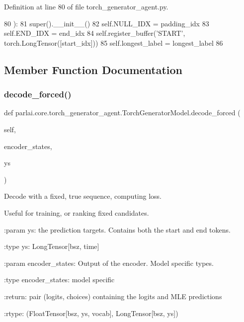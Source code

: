 Definition at line 80 of file torch\+\_\+generator\+\_\+agent.\+py.


\begin{DoxyCode}
80     ):
81         super().\_\_init\_\_()
82         self.NULL\_IDX = padding\_idx
83         self.END\_IDX = end\_idx
84         self.register\_buffer(\textcolor{stringliteral}{'START'}, torch.LongTensor([start\_idx]))
85         self.longest\_label = longest\_label
86 
\end{DoxyCode}


\subsection{Member Function Documentation}
\mbox{\label{classparlai_1_1core_1_1torch__generator__agent_1_1TorchGeneratorModel_abfc801c11be6fc49dfbc4e70dc6b8ed9}} 
\subsubsection{\texorpdfstring{decode\+\_\+forced()}{decode\_forced()}}
{\footnotesize\ttfamily def parlai.\+core.\+torch\+\_\+generator\+\_\+agent.\+Torch\+Generator\+Model.\+decode\+\_\+forced (\begin{DoxyParamCaption}\item[{}]{self,  }\item[{}]{encoder\+\_\+states,  }\item[{}]{ys }\end{DoxyParamCaption})}

\begin{DoxyVerb}Decode with a fixed, true sequence, computing loss.

Useful for training, or ranking fixed candidates.

:param ys:
    the prediction targets. Contains both the start and end tokens.

:type ys:
    LongTensor[bsz, time]

:param encoder_states:
    Output of the encoder. Model specific types.

:type encoder_states:
    model specific

:return:
    pair (logits, choices) containing the logits and MLE predictions

:rtype:
    (FloatTensor[bsz, ys, vocab], LongTensor[bsz, ys])
\end{DoxyVerb}
 

